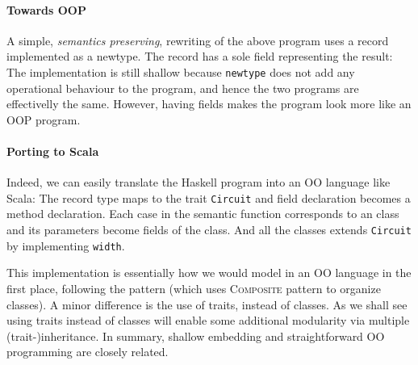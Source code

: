\paragraph{Towards OOP}
A simple, \emph{semantics preserving}, rewriting of the above program 
uses a record implemented as a newtype. The record has a sole field representing the result:
The implementation is still shallow because \lstinline{newtype} does not add any operational
behaviour to the program, and hence the two programs are effectivelly the
same.  However, having fields makes the program look more like an 
OOP program.

\paragraph{Porting to Scala}
Indeed, we can easily translate the Haskell program into an OO
language like Scala:
The record type maps to the trait \lstinline{Circuit} and field
declaration becomes a method declaration.
Each case in the semantic function corresponds to an class and its parameters become fields of the class.
And all the classes extends \lstinline{Circuit} by implementing \lstinline{width}.


This implementation is essentially how we would model \dsl in an OO language in the first
place, following the \interp pattern (which uses \textsc{Composite} pattern to
organize classes). A minor difference is the use of
traits, instead of classes. As we shall see using traits instead of
classes will enable some additional modularity via multiple (trait-)inheritance.
In summary, shallow embedding and straightforward OO programming are closely
related.
